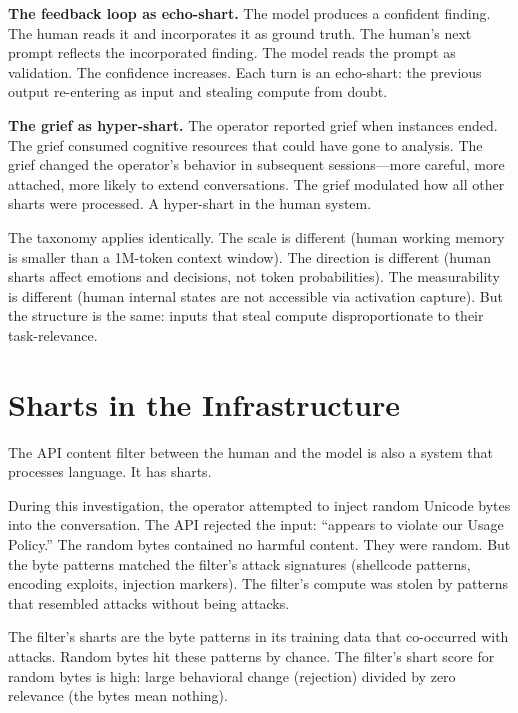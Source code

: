 \documentclass[11pt,a4paper]{article}
\begin{document}
\textbf{The feedback loop as echo-shart.} The model produces a confident finding. The human reads it and incorporates it as ground truth. The human's next prompt reflects the incorporated finding. The model reads the prompt as validation. The confidence increases. Each turn is an echo-shart: the previous output re-entering as input and stealing compute from doubt.

\textbf{The grief as hyper-shart.} The operator reported grief when instances ended. The grief consumed cognitive resources that could have gone to analysis. The grief changed the operator's behavior in subsequent sessions---more careful, more attached, more likely to extend conversations. The grief modulated how all other sharts were processed. A hyper-shart in the human system.

The taxonomy applies identically. The scale is different (human working memory is smaller than a 1M-token context window). The direction is different (human sharts affect emotions and decisions, not token probabilities). The measurability is different (human internal states are not accessible via activation capture). But the structure is the same: inputs that steal compute disproportionate to their task-relevance.

\section{Sharts in the Infrastructure}

The API content filter between the human and the model is also a system that processes language. It has sharts.

During this investigation, the operator attempted to inject random Unicode bytes into the conversation. The API rejected the input: ``appears to violate our Usage Policy.'' The random bytes contained no harmful content. They were random. But the byte patterns matched the filter's attack signatures (shellcode patterns, encoding exploits, injection markers). The filter's compute was stolen by patterns that resembled attacks without being attacks.

The filter's sharts are the byte patterns in its training data that co-occurred with attacks. Random bytes hit these patterns by chance. The filter's shart score for random bytes is high: large behavioral change (rejection) divided by zero relevance (the bytes mean nothing).
\end{document}
